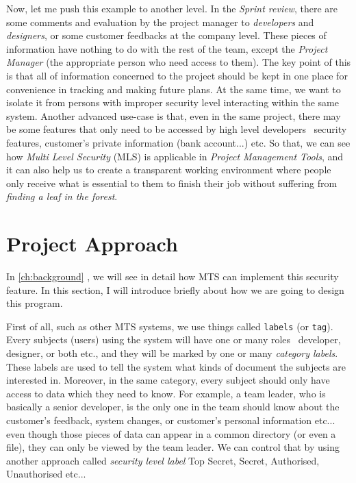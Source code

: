 Now, let me push this example to another level. In the \emph{Sprint review}, there are some comments and evaluation by the project manager to \emph{developers} and \emph{designers}, or some customer feedbacks at the company level.
These pieces of information have nothing to do with the rest of the team, except the \emph{Project Manager} (\ie the appropriate person who need access to them).
The key point of this is that all of information concerned to the project should be kept in one place for convenience in tracking and making future plans.
At the same time, we want to isolate it from persons with improper security level interacting within the same system.
Another advanced use-case is that, even in the same project, there may be some features that only need to be accessed by high level developers \eg\, security features, customer's private information (bank account...) etc.
So that, we can see how \emph{Multi Level Security} (MLS) is applicable in \emph{Project Management Tools}, and it can also help us to create a transparent working environment where people only receive what is essential to them to finish their job without suffering from \emph{finding a leaf in the forest}.

\section{Project Approach}
In \autoref{ch:background} , we will see in detail how MTS can implement this security feature.
In this section, I will introduce briefly about how we are going to design this program.

First of all, such as other MTS systems, we use things called \texttt{labels} (or \texttt{tag}).
Every subjects (\ie users) using the system will have one or many roles \eg\, developer, designer, or both etc., and they will be marked by one or many \emph{category labels}.
These labels are used to tell the system what kinds of document the subjects are interested in.
Moreover, in the same category, every subject should only have access to data which they need to know.
For example, a team leader, who is basically a senior developer, is the only one in the team should know about the customer's feedback, system changes, or customer's personal information etc...
even though those pieces of data can appear in a common directory (or even a file), they can only be viewed by the team leader.
We can control that by using another approach called \emph{security level label} \eg Top Secret, Secret, Authorised, Unauthorised etc...

